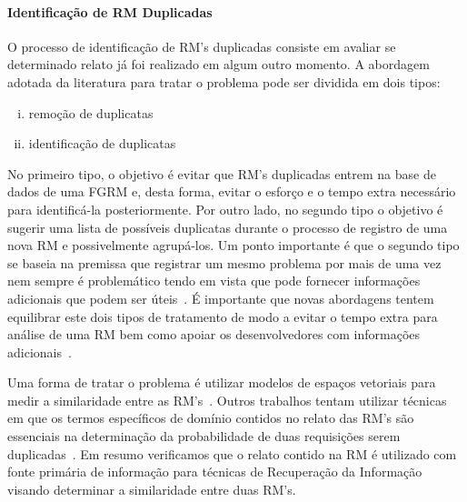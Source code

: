 \paragraph{Identificação de RM Duplicadas} O processo de identificação de RM's
duplicadas consiste em avaliar se determinado relato já foi realizado em algum
outro momento. A abordagem adotada da literatura para tratar o problema pode ser
dividida em dois tipos\cite{kaushik2012comparative, tian2012improved}:

\begin{enumerate}[(i)]
	\item remoção de duplicatas
	\item identificação de duplicatas
\end{enumerate}

No primeiro tipo, o objetivo é evitar que RM's duplicadas entrem na base de
dados de uma FGRM e, desta forma, evitar o esforço e o tempo extra necessário
para identificá-la posteriormente. Por outro lado, no segundo tipo o objetivo é
sugerir uma lista de possíveis duplicatas durante o processo de registro de uma
nova RM e possivelmente agrupá-los. Um ponto importante é que o segundo tipo se
baseia na premissa que registrar um mesmo problema por mais de uma vez nem
sempre é problemático tendo em vista que pode fornecer informações adicionais
que podem ser úteis~\cite{bettenburg2008duplicate}. É importante que novas
abordagens tentem equilibrar este dois tipos de tratamento de modo a evitar o
tempo extra para análise de uma RM bem como apoiar os desenvolvedores com
informações adicionais~\cite{Lerch:2013:FDY:2495256.2495763,Thung2014}.

Uma forma de tratar o problema é utilizar modelos de espaços vetoriais para
medir a similaridade entre as RM's~\cite{liu2014faceted, sun2010discriminative,
	Thung2014,tomavsev2013exploiting}. Outros trabalhos tentam utilizar técnicas
em que os termos específicos de domínio contidos no relato das RM's são
essenciais na determinação da probabilidade de duas requisições serem
duplicadas~\cite{hindle2016contextual, alipour2013contextual}.  Em resumo
verificamos que o relato contido na RM é utilizado com fonte primária de
informação para técnicas de Re\-cu\-pe\-ra\-ção da Informação visando determinar
a similaridade entre duas RM's.

